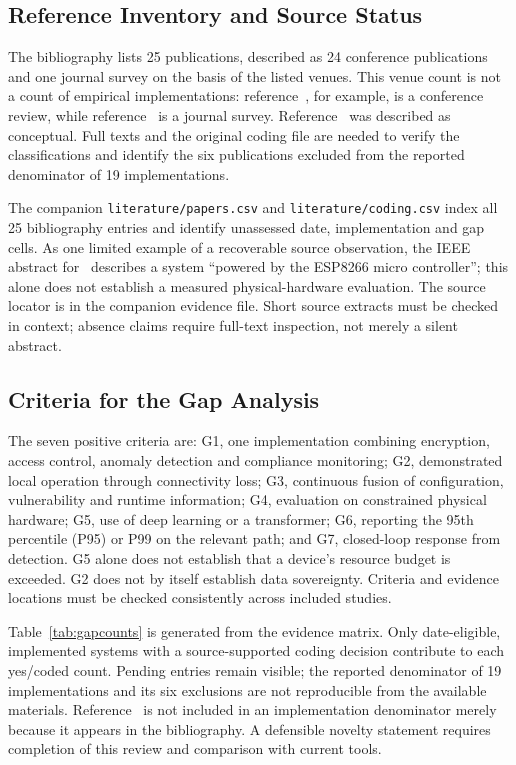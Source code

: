 \documentclass{ieeeaccess}
\begin{document}
\subsection{Reference Inventory and Source Status}
\label{subsec:paperanalysis}

The bibliography lists 25 publications, described as 24 conference publications and one journal survey on the basis of the listed venues. This venue count is not a count of empirical implementations: reference~\cite{b15}, for example, is a conference review, while reference~\cite{b24} is a journal survey. Reference~\cite{b1} was described as conceptual. Full texts and the original coding file are needed to verify the classifications and identify the six publications excluded from the reported denominator of 19 implementations.

The companion \texttt{literature/papers.csv} and \texttt{literature/coding.csv} index all 25 bibliography entries and identify unassessed date, implementation and gap cells. As one limited example of a recoverable source observation, the IEEE abstract for~\cite{b3} describes a system ``powered by the ESP8266 micro controller''; this alone does not establish a measured physical-hardware evaluation. The source locator is in the companion evidence file. Short source extracts must be checked in context; absence claims require full-text inspection, not merely a silent abstract.

\subsection{Criteria for the Gap Analysis}
\label{subsec:gapsummary}

The seven positive criteria are: G1, one implementation combining encryption, access control, anomaly detection and compliance monitoring; G2, demonstrated local operation through connectivity loss; G3, continuous fusion of configuration, vulnerability and runtime information; G4, evaluation on constrained physical hardware; G5, use of deep learning or a transformer; G6, reporting the 95th percentile (P95) or P99 on the relevant path; and G7, closed-loop response from detection. G5 alone does not establish that a device's resource budget is exceeded. G2 does not by itself establish data sovereignty. Criteria and evidence locations must be checked consistently across included studies.

Table~\ref{tab:gapcounts} is generated from the evidence matrix. Only date-eligible, implemented systems with a source-supported coding decision contribute to each yes/coded count. Pending entries remain visible; the reported denominator of 19 implementations and its six exclusions are not reproducible from the available materials. Reference~\cite{b1} is not included in an implementation denominator merely because it appears in the bibliography. A defensible novelty statement requires completion of this review and comparison with current tools.
\end{document}
